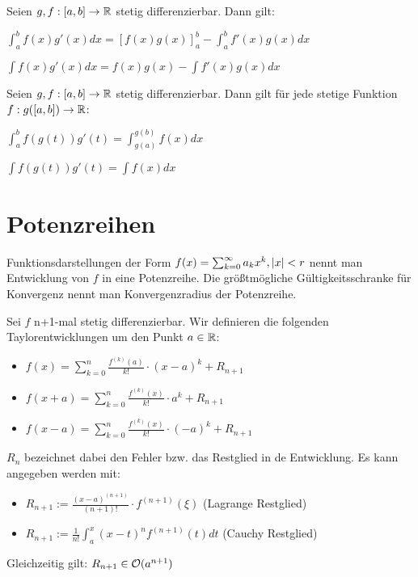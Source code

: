 \begin{satz}
	Seien $g,f : [a,b] \rightarrow \mathbb{R}$ stetig differenzierbar. Dann gilt:
	\begin{description}[noitemsep]
		\item $\int_{a}^{b} f(x)g'(x)dx = [f(x)g(x)]_a^b - \int_{a}^{b} f'(x)g(x)dx$
		\item $\int f(x)g'(x)dx = f(x)g(x) - \int f'(x)g(x)dx$	
	\end{description}
\end{satz}

\begin{satz}
	Seien $g,f : [a,b] \rightarrow \mathbb{R}$ stetig differenzierbar. Dann gilt für jede stetige Funktion $f : g([a,b]) \rightarrow \mathbb{R}$:
	\begin{description}[noitemsep]
		\item $\int_{a}^{b} f(g(t))g'(t) = \int_{g(a)}^{g(b)}f(x)dx$
		\item $\int f(g(t))g'(t) = \int f(x)dx$
	\end{description}
\end{satz}


\section{Potenzreihen}

\begin{definition}
	Funktionsdarstellungen der Form $f(x) = \sum_{k = 0}^{\infty} a_{k}x^k, |x| < r$ nennt man Entwicklung von $f$ in eine Potenzreihe. Die größtmögliche Gültigkeitsschranke für Konvergenz nennt man Konvergenzradius der Potenzreihe.
\end{definition}

\begin{satz}	
	Sei $f $ n+1-mal stetig differenzierbar. Wir definieren die folgenden Taylorentwicklungen um den Punkt $a \in \mathbb{R}$:
	
	\begin{itemize}[noitemsep]
		\item $f(x) =  \sum_{k = 0}^n \frac{f^{(k)}(a)}{k!} \cdot (x - a)^k + R_{n+1}$
		\item $f(x + a) = \sum_{k = 0}^n \frac{f^{(k)}(x)}{k!} \cdot a^k + R_{n+1}$
		\item $f(x - a) = \sum_{k = 0}^n \frac{f^{(k)}(x)}{k!} \cdot (-a)^k + R_{n+1}$
	\end{itemize}

	$R_n$ bezeichnet dabei den Fehler bzw. das Restglied in de Entwicklung. Es kann angegeben werden mit:
	
	\begin{itemize}[noitemsep]
		\item $R_{n+1} := \frac{(x - a)^{(n + 1)}}{(n + 1)!} \cdot f^{(n + 1)}(\xi)$ (Lagrange Restglied)
		\item $R_{n+1} := \frac{1}{n!} \int_{a}^{x} (x - t)^nf^{(n+1)}(t)dt$ (Cauchy Restglied)
	\end{itemize}

	Gleichzeitig gilt: $R_{n+1} \in \mathcal{O}(a^{n+1})$

\end{satz}

